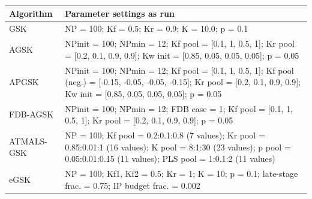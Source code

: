 \begin{tabular}{@{}l p{11.4cm}@{}}
\toprule
\textbf{Algorithm} & \textbf{Parameter settings as run} \\
\midrule
GSK & NP = 100; Kf = 0.5; Kr = 0.9; K = 10.0; p = 0.1 \\
AGSK & NPinit = 100; NPmin = 12; Kf pool = [0.1, 1, 0.5, 1]; Kr pool = [0.2, 0.1, 0.9, 0.9]; Kw init = [0.85, 0.05, 0.05, 0.05]; p = 0.05 \\
APGSK & NPinit = 100; NPmin = 12; Kf pool = [0.1, 1, 0.5, 1]; Kf pool (neg.) = [-0.15, -0.05, -0.05, -0.15]; Kr pool = [0.2, 0.1, 0.9, 0.9]; Kw init = [0.85, 0.05, 0.05, 0.05]; p = 0.05 \\
FDB-AGSK & NPinit = 100; NPmin = 12; FDB case = 1; Kf pool = [0.1, 1, 0.5, 1]; Kr pool = [0.2, 0.1, 0.9, 0.9]; p = 0.05 \\
ATMALS-GSK & NP = 100; Kf pool = 0.2:0.1:0.8 (7 values); Kr pool = 0.85:0.01:1 (16 values); K pool = 8:1:30 (23 values); p pool = 0.05:0.01:0.15 (11 values); PLS pool = 1:0.1:2 (11 values) \\
eGSK & NP = 100; Kf1, Kf2 = 0.5; Kr = 1; K = 10; p = 0.1; late-stage frac. = 0.75; IP budget frac. = 0.002 \\
\bottomrule
\end{tabular}

